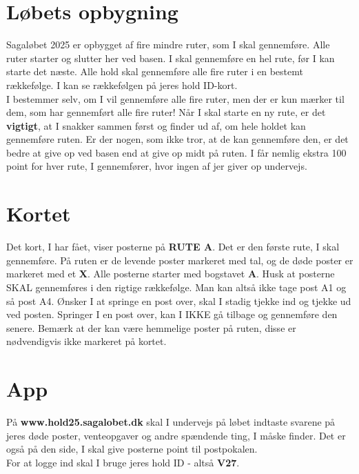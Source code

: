 \section{Løbets opbygning}
Sagaløbet 2025 er opbygget af fire mindre ruter, som I skal gennemføre. Alle ruter starter og slutter her ved basen. I skal gennemføre en hel rute, før I kan starte det næste. Alle hold skal gennemføre alle fire ruter i en bestemt rækkefølge. I kan se rækkefølgen på jeres hold ID-kort.\\\newline
I bestemmer selv, om I vil gennemføre alle fire ruter, men der er kun mærker til dem, som har gennemført alle fire ruter! Når I skal starte en ny rute, er det \textbf{vigtigt}, at I snakker sammen først og finder ud af, om hele holdet kan gennemføre ruten. Er der nogen, som ikke tror, at de kan gennemføre den, er det bedre at give op ved basen end at give op midt på ruten. I får nemlig ekstra 100 point for hver rute, I gennemfører, hvor ingen af jer giver op undervejs.\\
\section{Kortet}
Det kort, I har fået, viser posterne på \textbf{RUTE A}. Det er den første rute, I skal gennemføre. På ruten er de levende poster markeret med tal, og de døde poster er markeret med et \textbf{X}. Alle posterne starter med bogstavet \textbf{A}. Husk at posterne SKAL gennemføres i den rigtige rækkefølge. Man kan altså ikke tage post A1 og så post A4. Ønsker I at springe en post over, skal I stadig tjekke ind og tjekke ud ved posten. Springer I en post over, kan I IKKE gå tilbage og gennemføre den senere. Bemærk at der kan være hemmelige poster på ruten, disse er nødvendigvis ikke markeret på kortet.
\section{App}
På \textbf{www.hold25.sagalobet.dk} skal I undervejs på løbet indtaste svarene på jeres døde poster, venteopgaver og andre spændende ting, I måske finder. Det er også på den side, I skal give posterne point til postpokalen.\\
For at logge ind skal I bruge jeres hold ID - altså \textbf{V27}.
\newpage
